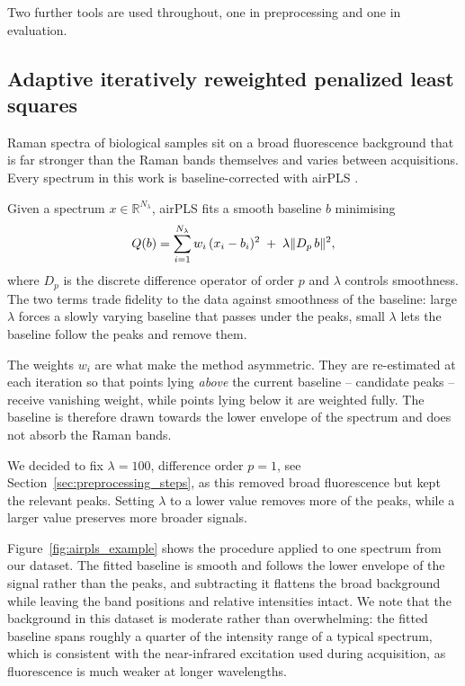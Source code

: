 Two further tools are used throughout, one in preprocessing and one in evaluation.

\subsection*{Adaptive iteratively reweighted penalized least squares}

Raman spectra of biological samples sit on a broad fluorescence background that is far stronger
than the Raman bands themselves and varies between acquisitions. Every spectrum in this work is
baseline-corrected with airPLS \cite{Zhang2010}.

Given a spectrum $x \in \mathbb{R}^{N_\lambda}$, airPLS fits a smooth baseline $b$ minimising
\begin{equation}
Q(b) = \sum_{i=1}^{N_\lambda} w_i \, (x_i - b_i)^2 \; + \; \lambda \lVert D_p \, b\rVert^2,
\label{eq:airpls}
\end{equation}
where $D_p$ is the discrete difference operator of order $p$ and $\lambda$ controls smoothness.
The two terms trade fidelity to the data against smoothness of the baseline: large $\lambda$
forces a slowly varying baseline that passes under the peaks, small $\lambda$ lets the baseline
follow the peaks and remove them.

The weights $w_i$ are what make the method asymmetric. They are re-estimated at each iteration
so that points lying \emph{above} the current baseline -- candidate peaks -- receive vanishing
weight, while points lying below it are weighted fully. The baseline is therefore drawn towards
the lower envelope of the spectrum and does not absorb the Raman bands.

We decided to fix $\lambda = 100$, difference
order $p = 1$, see Section~\ref{sec:preprocessing_steps}, as this removed broad fluorescence but kept the relevant peaks. Setting $\lambda$ to a lower value removes more of the peaks, while a larger value preserves more broader signals.

Figure~\ref{fig:airpls_example} shows the procedure applied to one spectrum from our dataset. The fitted baseline is smooth and follows the lower envelope of the signal rather than the peaks, and subtracting it flattens the broad background while leaving the band positions and relative intensities intact. We note that the background in this dataset is moderate rather than overwhelming: the fitted baseline spans roughly a quarter of the intensity range of a typical spectrum, which is consistent with the near-infrared excitation used during acquisition, as fluorescence is much weaker at longer wavelengths.

